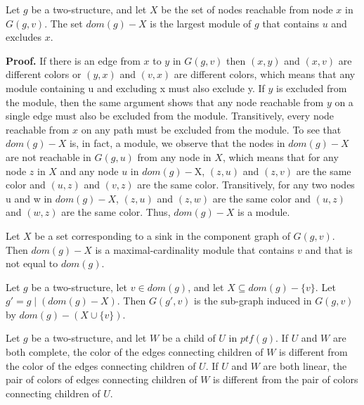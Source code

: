 \begin{mylem}
    \label{lem:5-3}
    Let $g$ be a two-structure, and let $X$ be the set of nodes reachable from node $x$ in $G(g, v)$.
    The set $dom(g) - X$ is the largest module of $g$ that contains $u$ and excludes $x$.
\end{mylem}

\textbf{Proof.}
If there is an edge from $x$ to $y$ in $G(g, v)$ then $(x, y)$ and $(x, v)$ are different colors or $(y, x)$ and $(v, x)$ are different colors, which means that any module containing u and excluding x must also exclude y.
If $y$ is excluded from the module, then the same argument shows that any node reachable from $y$ on a single edge must also be excluded from the module.
Transitively, every node reachable from $x$ on any path must be excluded from the module.
To see that $dom(g) - X$ is, in fact, a module, we observe that the nodes in $dom(g) - X$ are not reachable in $G(g, u)$ from any node in $X$, which means that for any node $z$ in $X$ and any node $u$ in $dom(g) - $X, $(z, u)$ and $(z, v)$ are the same color and $(u, z)$ and $(v,z)$ are the same color.
Transitively, for any two nodes u and w in $dom(g) - X$, $(z, u)$ and $(z, w)$ are the same color and $(u, z)$ and $(w, z)$ are the same color.
Thus, $dom(g) - X$ is a module.

\begin{mycor}
    \label{cor:}
    Let $X$ be a set corresponding to a sink in the component graph of $G(g, v)$.
    Then $dom(g) - X$ is a maximal-cardinality module that contains $v$ and that is not equal to $dom(g)$.
\end{mycor}

\begin{mypro}
    \label{prop:5-4}
    Let $g$ be a two-structure, let $v \in dom(g)$, and let $X \subseteq dom(g) - \{v\}$.
    Let $g' = g \mid (dom(g) - X)$.
    Then $G(g', v)$ is the sub-graph induced in $G(g, v)$ by $dom(g) - (X \cup \{v\})$.
\end{mypro}

\begin{mytheo}
    \label{thm:5-5}
    Let $g$ be a two-structure, and let $W$ be a child of $U$ in $ptf(g)$.
    If $U$ and $W$ are both complete, the color of the edges connecting children of $W$ is different from the color of the edges connecting children of $U$.
    If $U$ and $W$ are both linear, the pair of colors of edges connecting children of $W$ is different from the pair of colors connecting children of $U$.
\end{mytheo}


